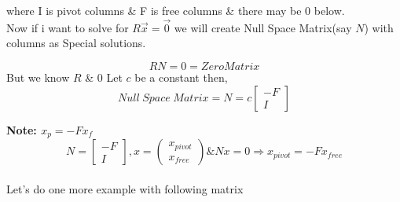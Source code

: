 \documentclass[a4paper,11pt]{article}
\numberwithin{equation}{section}
\begin{document}
\begin{itemize}
where I is pivot columns \& F is free columns \& there may be 0 below.\\

Now if i want to solve for $R\vec{x}=\vec{0}$ we will create Null Space Matrix(say $N$) with columns as Special solutions.

\begin{equation}
    RN=0=Zero Matrix
\end{equation}
But we know $R$ \& $0$ Let $c$ be a constant then,
\begin{equation}
    Null \hspace{3pt} Space \hspace{3pt}Matrix=N=c
    \begin{bmatrix}
        -F\\I
    \end{bmatrix}
\end{equation}

\textbf{Note: $x_{p}=-Fx_{f}$}\\
\begin{equation}
    N=
    \begin{bmatrix}
        -F\\I
    \end{bmatrix},x=
    \begin{pmatrix}
        x_{pivot}\\x_{free}
    \end{pmatrix} \&
    Nx=0\Longrightarrow 
    x_{pivot}=-Fx_{free}
\end{equation}\\

Let's do one more example with following matrix


\end{itemize}
\end{document}
